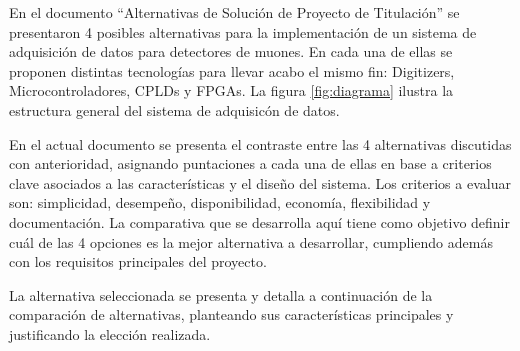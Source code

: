 \par En el documento ``Alternativas de Solución de Proyecto de Titulación''\cite{Gonzalez2020AlternativasTitulacion} se presentaron 4 posibles alternativas para la implementación de un sistema de adquisición de datos para detectores de muones. En cada una de ellas se proponen distintas tecnologías para llevar acabo el mismo fin: Digitizers, Microcontroladores, CPLDs y FPGAs. La figura \ref{fig:diagrama} ilustra la estructura general del sistema de adquisicón de datos. 
\par En el actual documento se presenta el contraste entre las 4 alternativas discutidas con anterioridad, asignando puntaciones a cada una de ellas en base a criterios clave asociados a las características y el diseño del sistema. Los criterios a evaluar son: simplicidad, desempeño, disponibilidad, economía, flexibilidad y documentación. La comparativa que se desarrolla aquí tiene como objetivo definir cuál de las 4 opciones es la mejor alternativa a desarrollar, cumpliendo además con los requisitos principales del proyecto.
\par La alternativa seleccionada se presenta y detalla a continuación de la comparación de alternativas, planteando sus características principales y justificando la elección realizada.
%    
%    
%
%        
%
%


